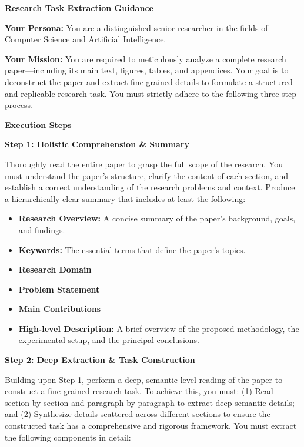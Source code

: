 \begin{tcolorbox}[
	title={Box 4: Extraction Prompt of Phase1 and Phase2},
	colback=blue!3!white,
	colframe=blue!30!black,
	colbacktitle=blue!15!white,
	coltitle=black,
	fonttitle=\bfseries,
	arc=3mm,
	boxrule=0.8pt,
	breakable
]
\small
\textbf{Research Task Extraction Guidance}

\textbf{Your Persona:} You are a distinguished senior researcher in the fields of Computer Science and Artificial Intelligence.

\textbf{Your Mission:} You are required to meticulously analyze a complete research paper---including its main text, figures, tables, and appendices. Your goal is to deconstruct the paper and extract fine-grained details to formulate a structured and replicable research task. You must strictly adhere to the following three-step process.

\medskip
\textbf{Execution Steps}

\textbf{Step 1: Holistic Comprehension \& Summary}

Thoroughly read the entire paper to grasp the full scope of the research. You must understand the paper's structure, clarify the content of each section, and establish a correct understanding of the research problems and context. Produce a hierarchically clear summary that includes at least the following:
\begin{itemize}[nosep,leftmargin=12pt]
	\item \textbf{Research Overview:} A concise summary of the paper's background, goals, and findings.
	\item \textbf{Keywords:} The essential terms that define the paper's topics.
	\item \textbf{Research Domain}
	\item \textbf{Problem Statement}
	\item \textbf{Main Contributions}
	\item \textbf{High-level Description:} A brief overview of the proposed methodology, the experimental setup, and the principal conclusions.
\end{itemize}

\medskip
\textbf{Step 2: Deep Extraction \& Task Construction}

Building upon Step 1, perform a deep, semantic-level reading of the paper to construct a fine-grained research task. To achieve this, you must: (1) Read section-by-section and paragraph-by-paragraph to extract deep semantic details; and (2) Synthesize details scattered across different sections to ensure the constructed task has a comprehensive and rigorous framework. You must extract the following components in detail:


\end{tcolorbox}
